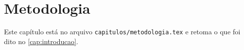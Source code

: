\chapter{Metodologia}\label{cap:metodologia}

Este capítulo está no arquivo \texttt{capitulos/metodologia.tex} e retoma o que foi dito no
\autoref{cap:introducao}.
